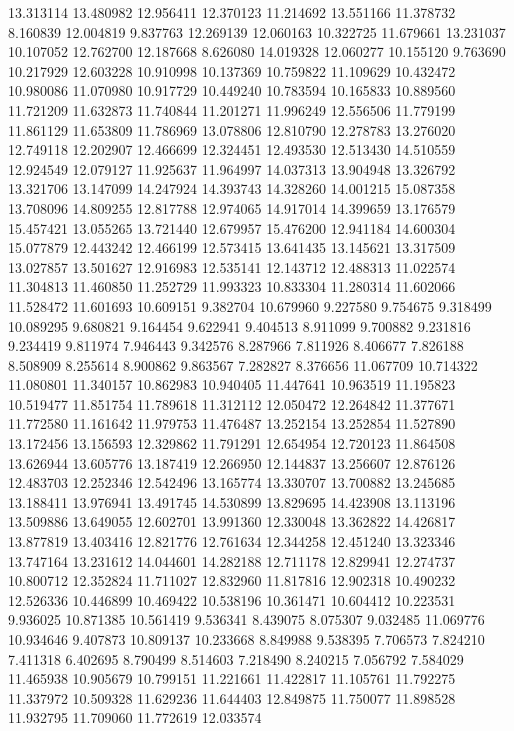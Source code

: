 13.313114
13.480982
12.956411
12.370123
11.214692
13.551166
11.378732
8.160839
12.004819
9.837763
12.269139
12.060163
10.322725
11.679661
13.231037
10.107052
12.762700
12.187668
8.626080
14.019328
12.060277
10.155120
9.763690
10.217929
12.603228
10.910998
10.137369
10.759822
11.109629
10.432472
10.980086
11.070980
10.917729
10.449240
10.783594
10.165833
10.889560
11.721209
11.632873
11.740844
11.201271
11.996249
12.556506
11.779199
11.861129
11.653809
11.786969
13.078806
12.810790
12.278783
13.276020
12.749118
12.202907
12.466699
12.324451
12.493530
12.513430
14.510559
12.924549
12.079127
11.925637
11.964997
14.037313
13.904948
13.326792
13.321706
13.147099
14.247924
14.393743
14.328260
14.001215
15.087358
13.708096
14.809255
12.817788
12.974065
14.917014
14.399659
13.176579
15.457421
13.055265
13.721440
12.679957
15.476200
12.941184
14.600304
15.077879
12.443242
12.466199
12.573415
13.641435
13.145621
13.317509
13.027857
13.501627
12.916983
12.535141
12.143712
12.488313
11.022574
11.304813
11.460850
11.252729
11.993323
10.833304
11.280314
11.602066
11.528472
11.601693
10.609151
9.382704
10.679960
9.227580
9.754675
9.318499
10.089295
9.680821
9.164454
9.622941
9.404513
8.911099
9.700882
9.231816
9.234419
9.811974
7.946443
9.342576
8.287966
7.811926
8.406677
7.826188
8.508909
8.255614
8.900862
9.863567
7.282827
8.376656
11.067709
10.714322
11.080801
11.340157
10.862983
10.940405
11.447641
10.963519
11.195823
10.519477
11.851754
11.789618
11.312112
12.050472
12.264842
11.377671
11.772580
11.161642
11.979753
11.476487
13.252154
13.252854
11.527890
13.172456
13.156593
12.329862
11.791291
12.654954
12.720123
11.864508
13.626944
13.605776
13.187419
12.266950
12.144837
13.256607
12.876126
12.483703
12.252346
12.542496
13.165774
13.330707
13.700882
13.245685
13.188411
13.976941
13.491745
14.530899
13.829695
14.423908
13.113196
13.509886
13.649055
12.602701
13.991360
12.330048
13.362822
14.426817
13.877819
13.403416
12.821776
12.761634
12.344258
12.451240
13.323346
13.747164
13.231612
14.044601
14.282188
12.711178
12.829941
12.274737
10.800712
12.352824
11.711027
12.832960
11.817816
12.902318
10.490232
12.526336
10.446899
10.469422
10.538196
10.361471
10.604412
10.223531
9.936025
10.871385
10.561419
9.536341
8.439075
8.075307
9.032485
11.069776
10.934646
9.407873
10.809137
10.233668
8.849988
9.538395
7.706573
7.824210
7.411318
6.402695
8.790499
8.514603
7.218490
8.240215
7.056792
7.584029
11.465938
10.905679
10.799151
11.221661
11.422817
11.105761
11.792275
11.337972
10.509328
11.629236
11.644403
12.849875
11.750077
11.898528
11.932795
11.709060
11.772619
12.033574

